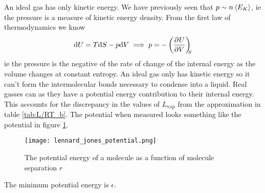\documentclass{article}
\begin{document}
    An ideal gas has only kinetic energy.
    We have previously seen that \(p\sim n\left\langle{E_K}\right\rangle\), ie the pressure is a measure of kinetic energy density.
    From the first law of thermodynamics we know
    \[\dd U = T\dd S - p\dd V \implies p = -\left(\pdv[]{U}{V}\right)_{\!\!\!{S}}\]
    ie the pressure is the negative of the rate of change of the internal energy as the volume changes at constant entropy.
    An ideal gas only has kinetic energy so it can't form the intermolecular bonds necessary to condense into a liquid.
    Real gasses can as they have a potential energy contribution to their internal energy.
    This accounts for the discrepancy in the values of \(L_\text{vap}\) from the approximation in table \ref{tab:L/RT_b}.
    The potential when measured looks something like the potential in figure \ref{fig:potential graph}.
    \begin{figure}[ht]
        \centering
        \texttt{[image: lennard\_jones\_potential.png]}
        \caption{The potential energy of a molecule as a function of molecule separation \(r\)}
        \label{fig:potential graph}
    \end{figure}
    The minimum potential energy is \(\epsilon\).
    
\end{document}

